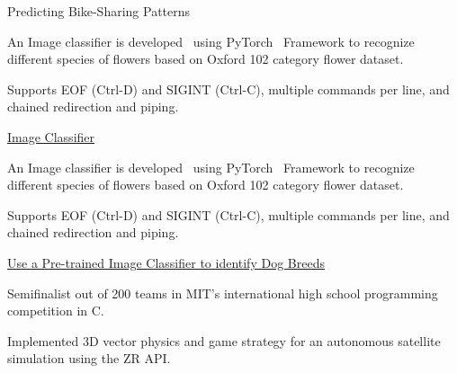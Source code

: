 
\begin{cventries}
  \cventry
    {} %
    {Predicting Bike-Sharing Patterns} %
    {} %
    {} %
    {
      \begin{cvitems} %
        \item {An Image classifier is developed  using PyTorch  Framework to recognize different species of flowers based on Oxford 102 category flower dataset.}
		\item {Supports EOF (Ctrl-D) and SIGINT (Ctrl-C), multiple commands per line, and chained redirection and piping.}
      \end{cvitems}
    }

  \cventry
    {} %
    {\href{https://github.com/classofai/Flower-Species-Classifier-Project.git}{Image Classifier}} %
    {} %
    {} %
    {
      \begin{cvitems} %
        \item {An Image classifier is developed  using PyTorch  Framework to recognize different species of flowers based on Oxford 102 category flower dataset.}
		\item {Supports EOF (Ctrl-D) and SIGINT (Ctrl-C), multiple commands per line, and chained redirection and piping.}
      \end{cvitems}
    }

  \cventry
    {} %
    {\href{https://github.com/classofai/Flower-Species-Classifier-Project.git}{Use a Pre-trained Image Classifier to identify Dog Breeds}} %
    {} %
    {} %
    {
      \begin{cvitems} %
      	\item {Semifinalist out of 200 teams in MIT's international high school programming competition in C.}
		\item {Implemented 3D vector physics and game strategy for an autonomous satellite simulation using the ZR API.}
      \end{cvitems}
    }
\end{cventries}
